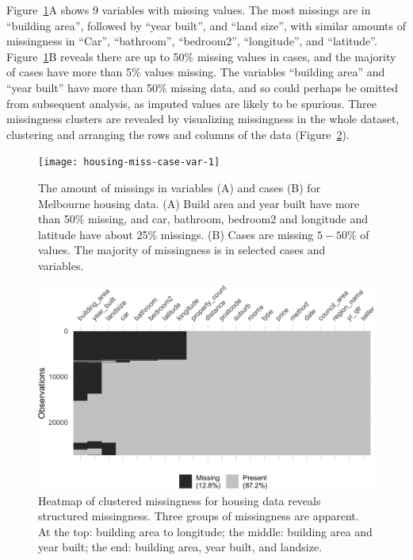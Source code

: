 \documentclass[article]{jss}
\begin{document}
Figure~\ref{fig:housing-miss-case-var}A shows 9 variables with missing
values.  The most missings are in ``building area'', followed by ``year
built'', and ``land size'', with similar amounts of missingness in ``Car'',
``bathroom'', ``bedroom2'', ``longitude'', and ``latitude''.
Figure~\ref{fig:housing-miss-case-var}B reveals there are up to 50\% missing
values in cases, and the majority of cases have more than 5\% values
missing.  The variables ``building area'' and ``year built'' have more than
50\% missing data, and so could perhaps be omitted from subsequent analysis,
as imputed values are likely to be spurious.  Three missingness clusters are
revealed by visualizing missingness in the whole dataset, clustering and
arranging the rows and columns of the data
(Figure~\ref{fig:applic-vis-miss}).

\begin{figure}[t!]
\centering
\texttt{[image: housing-miss-case-var-1]}
\caption[The amount of missings in variables (A) and cases (B) for Melbourne
housing data]{The amount of missings in variables (A) and cases (B) for
Melbourne housing data.  (A) Build area and year built have more than 50\%
missing, and car, bathroom, bedroom2 and longitude and latitude have about
25\% missings.  (B) Cases are missing $5 - 50\%$ of values.  The majority of
missingness is in selected cases and
variables.}\label{fig:housing-miss-case-var}
\end{figure}

\begin{figure}[t!]
\centering
\includegraphics[width=0.85\linewidth]{applic-vis-miss-1}
\caption[Heatmap of clustered missingness for housing data reveals
structured missingness]{Heatmap of clustered missingness for housing data
reveals structured missingness.  Three groups of missingness are apparent.
At the top: building area to longitude; the middle: building area and year
built; the end: building area, year built, and
landsize.}\label{fig:applic-vis-miss}
\end{figure}
\end{document}
